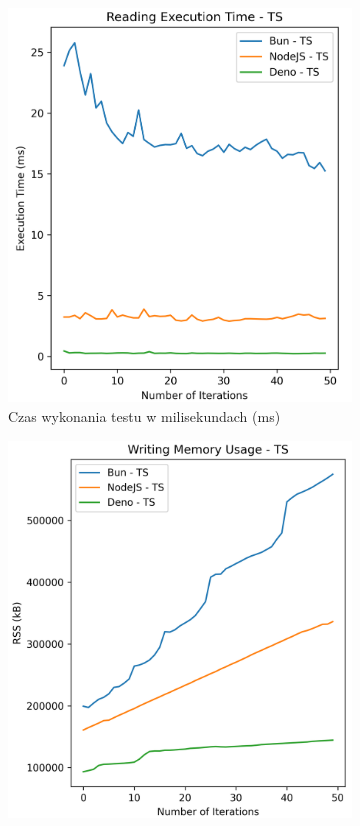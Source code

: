 \begin{figure}[H]
  \centering
  \begin{subfigure}[b]{0.42\textwidth}
    \centering
    \includegraphics[width=\textwidth]{Figures/files/files_writing_50_500_50_ts_time.png}
    \caption{Czas wykonania testu w milisekundach (ms)}
    \label{fig:file_e1_writing_ts_time}
  \end{subfigure}
  \begin{subfigure}[b]{0.42\textwidth}
    \centering
    \includegraphics[width=\textwidth]{Figures/files/files_writing_50_500_50_ts_memory.png}

\end{subfigure}
\end{figure}

